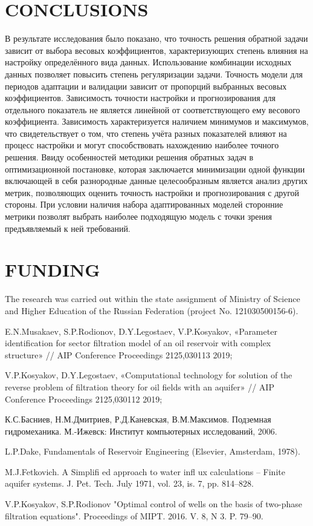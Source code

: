 \documentclass{article}
\begin{document}
\section{CONCLUSIONS}

В результате исследования было показано, что точность решения обратной задачи зависит от выбора весовых коэффициентов, характеризующих степень влияния на настройку определённого вида данных. Использование комбинации исходных данных позволяет повысить степень регуляризации задачи. Точность модели для периодов адаптации и валидации зависит от пропорций выбранных весовых коэффициентов. Зависимость точности настройки и прогнозирования для отдельного показатель не является линейной от соответствующего ему весового коэффициента. Зависимость характеризуется наличием минимумов и максимумов, что свидетельствует о том, что степень учёта разных показателей влияют на процесс настройки и могут способствовать нахождению наиболее точного решения. Ввиду особенностей методики решения обратных задач в оптимизационной постановке, которая заключается минимизации одной функции включающей в себя разнородные данные целесообразным является анализ других метрик, позволяющих оценить точность настройки и прогнозирования с другой стороны. При условии наличия набора адаптированных моделей сторонние метрики позволят выбрать наиболее подходящую модель с точки зрения предъявляемый к ней требований.


\section{FUNDING}
The research was carried out within the state assignment of Ministry of Science and Higher Education of the Russian Federation (project No. 121030500156-6).

%
%
\begin{thebibliography}{99}
 E.N.Musakaev, S.P.Rodionov, D.Y.Legostaev, V.P.Kosyakov,  «Parameter identification for sector filtration model of an oil reservoir with complex structure» // AIP Conference Proceedings 2125,030113 2019;

 V.P.Kosyakov, D.Y.Legostaev,  «Computational technology for solution of the reverse problem of filtration theory for oil fields with an aquifer» // AIP Conference Proceedings 2125,030112 2019;

 К.С.Басниев, Н.М.Дмитриев, Р.Д.Каневская, В.М.Максимов. Подземная гидромеханика.  М.-Ижевск: Институт компьютерных исследований, 2006. 

 L.P.Dake, Fundamentals of Reservoir Engineering (Elsevier, Amsterdam, 1978).

 M.J.Fetkovich. A Simplifi ed approach to water infl ux calculations – Finite aquifer systems. J. Pet. Tech. July 1971, vol. 23, is. 7, pp. 814–828.

 V.P.Kosyakov, S.P.Rodionov "Optimal control of wells on the basis of two-phase filtration equations". Proceedings of MIPT. 2016. V. 8, N 3. P. 79–90.


\end{thebibliography}
\end{document}
